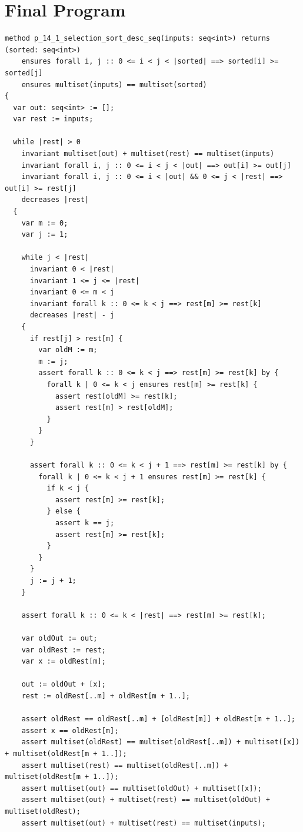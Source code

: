 \documentclass{article}
\begin{document}
\section*{Final Program}
\begin{lstlisting}
method p_14_1_selection_sort_desc_seq(inputs: seq<int>) returns (sorted: seq<int>)
	ensures forall i, j :: 0 <= i < j < |sorted| ==> sorted[i] >= sorted[j]
	ensures multiset(inputs) == multiset(sorted)
{
  var out: seq<int> := [];
  var rest := inputs;

  while |rest| > 0
    invariant multiset(out) + multiset(rest) == multiset(inputs)
    invariant forall i, j :: 0 <= i < j < |out| ==> out[i] >= out[j]
    invariant forall i, j :: 0 <= i < |out| && 0 <= j < |rest| ==> out[i] >= rest[j]
    decreases |rest|
  {
    var m := 0;
    var j := 1;

    while j < |rest|
      invariant 0 < |rest|
      invariant 1 <= j <= |rest|
      invariant 0 <= m < j
      invariant forall k :: 0 <= k < j ==> rest[m] >= rest[k]
      decreases |rest| - j
    {
      if rest[j] > rest[m] {
        var oldM := m;
        m := j;
        assert forall k :: 0 <= k < j ==> rest[m] >= rest[k] by {
          forall k | 0 <= k < j ensures rest[m] >= rest[k] {
            assert rest[oldM] >= rest[k];
            assert rest[m] > rest[oldM];
          }
        }
      }

      assert forall k :: 0 <= k < j + 1 ==> rest[m] >= rest[k] by {
        forall k | 0 <= k < j + 1 ensures rest[m] >= rest[k] {
          if k < j {
            assert rest[m] >= rest[k];
          } else {
            assert k == j;
            assert rest[m] >= rest[k];
          }
        }
      }
      j := j + 1;
    }

    assert forall k :: 0 <= k < |rest| ==> rest[m] >= rest[k];

    var oldOut := out;
    var oldRest := rest;
    var x := oldRest[m];

    out := oldOut + [x];
    rest := oldRest[..m] + oldRest[m + 1..];

    assert oldRest == oldRest[..m] + [oldRest[m]] + oldRest[m + 1..];
    assert x == oldRest[m];
    assert multiset(oldRest) == multiset(oldRest[..m]) + multiset([x]) + multiset(oldRest[m + 1..]);
    assert multiset(rest) == multiset(oldRest[..m]) + multiset(oldRest[m + 1..]);
    assert multiset(out) == multiset(oldOut) + multiset([x]);
    assert multiset(out) + multiset(rest) == multiset(oldOut) + multiset(oldRest);
    assert multiset(out) + multiset(rest) == multiset(inputs);


\end{lstlisting}
\end{document}

